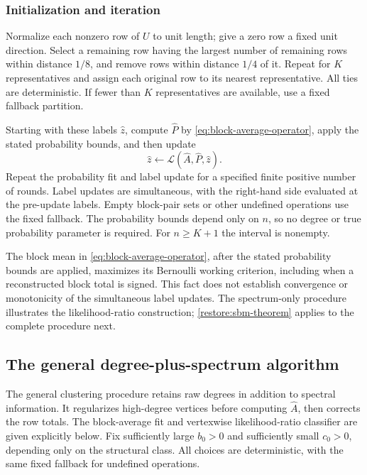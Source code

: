 \subsubsection{Initialization and iteration}

Normalize each nonzero row of $U$ to unit length; give a zero row a
fixed unit direction. Select a remaining row having the largest
number of remaining rows within distance $1/8$, and remove rows within
distance $1/4$ of it. Repeat for $K$ representatives and assign each
original row to its nearest representative. All ties are deterministic.
If fewer than $K$ representatives are available, use a fixed fallback
partition.

Starting with these labels $\widehat z$, compute $\widehat P$ by
\eqref{eq:block-average-operator}, apply the stated probability bounds,
and then update
\begin{equation}\label{eq:simple-fit}
 \widehat z\leftarrow\mathcal L(\widehat A,\widehat P,\widehat z).
\end{equation}
Repeat the probability fit and label update for a specified finite
positive number of rounds. Label updates are simultaneous, with the
right-hand side evaluated at the pre-update labels. Empty block-pair
sets or other undefined operations use the fixed fallback.
The probability bounds depend only on $n$, so no degree or true
probability parameter is required. For $n\ge K+1$ the interval is nonempty.

The block mean in \eqref{eq:block-average-operator}, after the stated
probability bounds are applied, maximizes
its Bernoulli working criterion, including when a reconstructed block
total is signed.
This fact does not establish convergence or monotonicity of the
simultaneous label updates. The spectrum-only procedure illustrates
the likelihood-ratio construction; \cref{restore:sbm-theorem} applies to the complete procedure next.

\subsection{The general degree-plus-spectrum algorithm}
\label{restore:algorithm}

The general clustering procedure retains raw degrees in addition to
spectral information. It regularizes high-degree vertices before computing
$\widehat A$, then corrects the row totals. The block-average fit
and vertexwise likelihood-ratio classifier are given explicitly below.
Fix sufficiently large $b_0>0$ and sufficiently small
$c_0>0$, depending only on the structural class. All choices are
deterministic, with the same fixed fallback for undefined operations.

